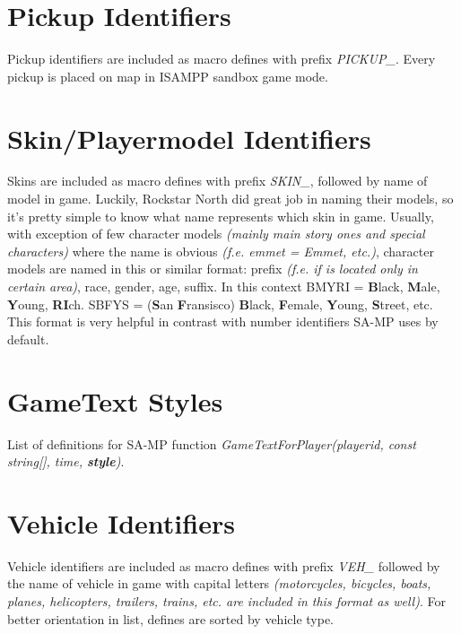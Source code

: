 \documentclass{article}
\begin{document}
\section{Pickup Identifiers}
Pickup identifiers are included as macro defines with prefix \textit{PICKUP\_}. Every pickup is placed on map in ISAMPP sandbox game mode.

\section{Skin/Playermodel Identifiers}
Skins are included as macro defines with prefix \textit{SKIN\_}, followed by name of model in game. Luckily, Rockstar North did great job in naming their models, so it's pretty simple to know what name represents which skin in game. Usually, with exception of few character models \textit{(mainly main story ones and special characters)} where the name is obvious \textit{(f.e. emmet = Emmet, etc.)}, character models are named in this or similar format: prefix \textit{(f.e. if is located only in certain area)}, race, gender, age, suffix. In this context BMYRI = \textbf{B}lack, \textbf{M}ale, \textbf{Y}oung, \textbf{RI}ch. SBFYS = (\textbf{S}an \textbf{F}ransisco) \textbf{B}lack, \textbf{F}emale, \textbf{Y}oung, \textbf{S}treet, etc. This format is very helpful in contrast with number identifiers SA-MP uses by default.

\section{GameText Styles}
List of definitions for SA-MP function \textit{GameTextForPlayer(playerid, const string[], time, \textbf{style})}.

\section{Vehicle Identifiers}
Vehicle identifiers are included as macro defines with prefix \textit{VEH\_} followed by the name of vehicle in game with capital letters \textit{(motorcycles, bicycles, boats, planes, helicopters, trailers, trains, etc. are included in this format as well)}. For better orientation in list, defines are sorted by vehicle type.
\end{document}
